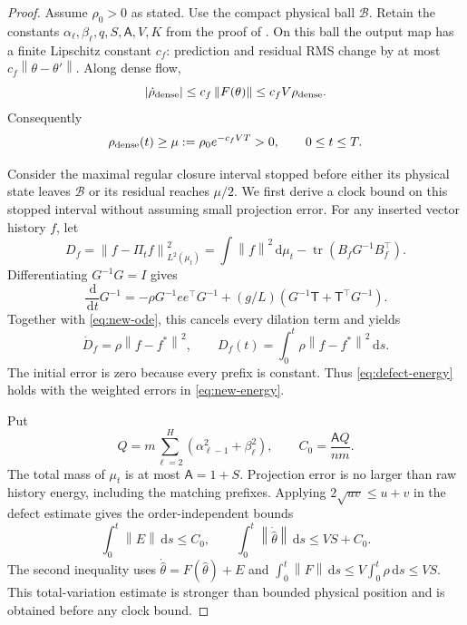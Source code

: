 \documentclass[11pt]{article}
\theoremstyle{definition}
\theoremstyle{remark}
\newcommand{\norm}[1]{\left\lVert #1\right\rVert}
\newcommand{\dd}{\,\mathrm{d}}
\begin{document}
\begin{proof}
Assume $\rho_0>0$ as stated.  Use the compact physical ball $\mathcal B$.
Retain the constants
$\alpha_\ell,\beta_\ell,q,S,\mathsf A,V,K$ from the proof of
.  On this ball the output map has a finite Lipschitz constant
$c_f$: prediction and residual RMS change by at most
$c_f\norm{\theta-\theta'}$.  Along dense flow,
\[
 |\dot\rho_{\rm dense}|\le c_f\norm{F(\theta)}
 \le c_fV\rho_{\rm dense}.
\]
Consequently
\begin{equation}
 \rho_{\rm dense}(t)\ge
 \mu:=\rho_0e^{-c_fVT}>0,\qquad 0\le t\le T.          \label{eq:dense-rho-lower}
\end{equation}

Consider the maximal regular closure interval stopped before either its
physical state leaves $\mathcal B$ or its residual reaches $\mu/2$.  We first
derive a clock bound on this stopped interval without assuming small
projection error.  For any inserted vector history $f$, let
\[
 D_f=\norm{f-\Pi_t f}_{L^2(\mu_t)}^2
 =\int\norm f^2\dd\mu_t-\operatorname{tr}(B_fG^{-1}B_f^\top).
\]
Differentiating $G^{-1}G=I$ gives
\[
 \frac{\dd}{\dd t}G^{-1}
 =-\rho G^{-1}ee^\top G^{-1}
 +(g/L)(G^{-1}\mathsf T+\mathsf T^\top G^{-1}).
\]
Together with \eqref{eq:new-ode}, this cancels every dilation term and yields
\begin{equation}
 \dot D_f=\rho\norm{f-f^*}^2,\qquad
 D_f(t)=\int_0^t\rho\norm{f-f^*}^2\dd s.             \label{eq:new-energy}
\end{equation}
The initial error is zero because every prefix is constant.  Thus
\eqref{eq:defect-energy} holds with the weighted errors in
\eqref{eq:new-energy}.

Put
\[
 Q=m\sum_{\ell=2}^H(\alpha_{\ell-1}^2+\beta_\ell^2),
 \qquad C_0=\frac{\mathsf A Q}{nm}.
\]
The total mass of $\mu_t$ is at most $\mathsf A=1+S$.  Projection error is no
larger than raw history energy, including the matching prefixes.  Applying
$2\sqrt{uv}\le u+v$ in the defect estimate gives the order-independent bounds
\begin{equation}
 \int_0^t\norm E\dd s\le C_0,\qquad
 \int_0^t\norm{\dot{\widehat\theta}}\dd s
 \le VS+C_0.                                         \label{eq:coarse-new}
\end{equation}
The second inequality uses
$\dot{\widehat\theta}=F(\widehat\theta)+E$ and
$\int_0^t\norm F\dd s\le V\int_0^t\rho\dd s\le VS$.
This total-variation estimate is stronger than bounded physical position and
is obtained before any clock bound.


\end{proof}
\end{document}
